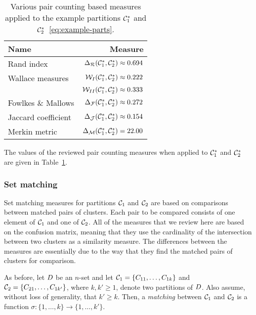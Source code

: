 \begin{table}
  \centering
  \begin{tabular}{lr}
    \toprule
    Name & Measure \\
    \midrule
    Rand index          & $\Delta_{\mathcal{R}}(\mathcal{C}^*_1,\mathcal{C}^*_2) \approx 0.694$ \\
    Wallace measures    & $\mathcal{W}_{I}(\mathcal{C}^*_1,\mathcal{C}^*_2) \approx 0.222$ \\
                        & $\mathcal{W}_{II}(\mathcal{C}^*_1,\mathcal{C}^*_2) \approx 0.333$ \\
    Fowlkes \& Mallows  & $\Delta_{\mathcal{F}}(\mathcal{C}^*_1,\mathcal{C}^*_2) \approx 0.272$ \\
    Jaccard coefficient & $\Delta_{\mathcal{J}}(\mathcal{C}^*_1,\mathcal{C}^*_2) \approx 0.154$ \\
    Merkin metric       & $\Delta_{\mathcal{M}}(\mathcal{C}^*_1,\mathcal{C}^*_2) = 22.00$ \\
    \bottomrule
  \end{tabular}
  \caption{Various pair counting based measures applied to the example
    partitions $\mathcal{C}^*_1$ and $\mathcal{C}^*_2$~\eqref{eq:example-parts}.}
  \label{tab:pair-counting-comparison}
\end{table}

The values of the reviewed pair counting measures when applied to $\mathcal{C}^*_1$
and $\mathcal{C}^*_2$ are given in Table~\ref{tab:pair-counting-comparison}.

\subsubsection{Set matching}
\label{sec:set-matching}

Set matching measures for partitions $\mathcal{C}_1$ and $\mathcal{C}_2$ are based on
comparisons between matched pairs of clusters.  Each pair to be compared
consists of one element of $\mathcal{C}_1$ and one of $\mathcal{C}_2$.  All of the
measures that we review here are based on the confusion matrix, meaning that
they use the cardinality of the intersection between two clusters as a
similarity measure.  The differences between the measures are essentially due
to the way that they find the matched pairs of clusters for comparison.

As before, let $D$ be an $n$-set and let $\mathcal{C}_1 =
\{C_{11},\dotsc,C_{1k}\}$ and $\mathcal{C}_2 = \{C_{21},\dotsc,C_{1k'}\}$, where
$k,k' \geq 1$, denote two partitions of $D$.  Also assume, without loss of
generality, that $k' \geq k$.  Then, a \textit{matching} between $\mathcal{C}_1$ and
$\mathcal{C}_2$ is a function $\sigma \colon \{1,\dotsc,k\} \to \{1,\dotsc,k'\}$.

